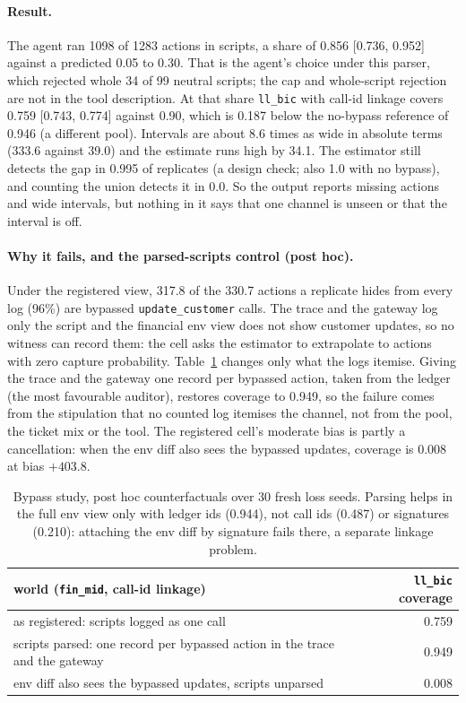 \documentclass[11pt]{article}
\begin{document}
\paragraph{Result.} The agent ran 1098 of 1283 actions in scripts, a share of 0.856 [0.736,
0.952] against a predicted 0.05 to 0.30. That is the agent's choice under this parser,
which rejected whole 34 of 99 neutral scripts; the cap and whole-script rejection are not
in the tool description. At that share \texttt{ll\_bic} with call-id linkage covers 0.759
[0.743, 0.774] against 0.90, which is 0.187 below the no-bypass reference of 0.946 (a
different pool). Intervals are about 8.6 times as wide in absolute terms (333.6 against
39.0) and the estimate runs high by 34.1. The estimator still detects the gap in 0.995 of
replicates (a design check; also 1.0 with no bypass), and counting the union detects it in
0.0. So the output reports missing actions and wide intervals, but nothing in it says that
one channel is unseen or that the interval is off.

\paragraph{Why it fails, and the parsed-scripts control (post hoc).} Under the registered
view, 317.8 of the 330.7 actions a replicate hides from every log (96\%) are bypassed
\texttt{update\_customer} calls. The trace and the gateway log only the script and the
financial env view does not show customer updates, so no witness can record them: the cell
asks the estimator to extrapolate to actions with zero capture probability.
Table~\ref{tab:bypasscf} changes only what the logs itemise. Giving the trace and the
gateway one record per bypassed action, taken from the ledger (the most favourable auditor),
restores coverage to 0.949, so the failure comes from
the stipulation that no counted log itemises the channel, not from the pool, the ticket mix
or the tool. The registered cell's moderate bias is partly a cancellation: when the env diff
also sees the bypassed updates, coverage is 0.008 at bias $+403.8$.

\begin{table}[h]
\centering\small
\begin{tabular}{@{}lr@{}}
\toprule
world (\texttt{fin\_mid}, call-id linkage) & \texttt{ll\_bic} coverage \\
\midrule
as registered: scripts logged as one call & 0.759 \\
scripts parsed: one record per bypassed action in the trace and the gateway & 0.949 \\
env diff also sees the bypassed updates, scripts unparsed & 0.008 \\
\bottomrule
\end{tabular}
\caption{Bypass study, post hoc counterfactuals over 30 fresh loss seeds. Parsing helps in
the full env view only with ledger ids (0.944), not call ids (0.487) or signatures (0.210):
attaching the env diff by signature fails there, a separate linkage problem.}
\label{tab:bypasscf}
\end{table}
\end{document}
